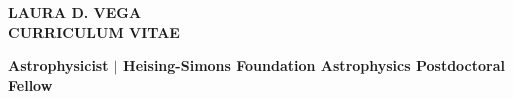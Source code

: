 \documentclass[letter,12pt]{article}
\begin{document}
\pagestyle{fancy}
\fancyhf{}
\renewcommand{\headrulewidth}{0pt}


\begin{center} 
\bfseries{
\LARGE \uppercase{Laura D. Vega} \\
\large \uppercase{Curriculum Vitae}}
\end{center}

\noindent
\begin{center}{\bf Astrophysicist \(|\) Heising-Simons Foundation Astrophysics Postdoctoral Fellow} \\
\end{center}
\end{document}

